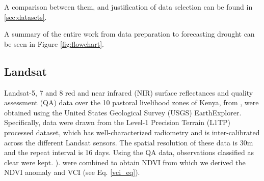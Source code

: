 \documentclass[review]{elsarticle}
\begin{document}
 A comparison between them, and justification of data selection can be found in \ref{sec:datasets}.  

A summary of the entire work from data preparation to forecasting drought can be seen in Figure \ref{fig:flowchart}.

\subsection{Landsat}
Landsat-5, 7 and 8 \citep{royetal} red and near infrared (NIR) surface reflectances and quality assessment (QA) data over the 10 pastoral livelihood zones of Kenya, from , were obtained using the United States Geological Survey (USGS) EarthExplorer. Specifically, data were drawn from the Level-1 Precision Terrain (L1TP) processed dataset, which has well-characterized radiometry and is inter-calibrated across the different Landsat sensors. The spatial resolution of these data is 30m and the repeat interval is 16 days. Using the QA data, observations classified as clear were kept. ). %
 were combined to obtain 
NDVI 
from which we derived the NDVI anomaly and VCI {\color{blue}(see Eq. \ref{vci_eq})}. 
\end{document}
